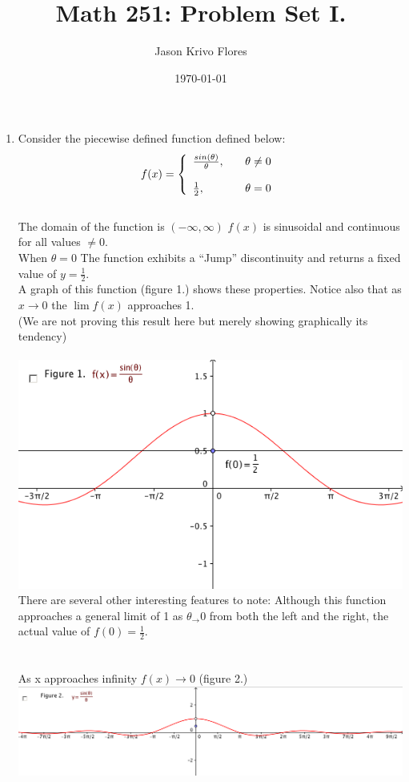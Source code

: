 \documentclass{article}
\title{Math 251: Problem Set I.}
\author{Jason Krivo Flores}
\date{\today}
\begin{document}
\maketitle{}
%
\begin{enumerate}
 \item Consider the piecewise defined function defined below:\\
\[
  f(x) = \left\{ 
  \begin{array}{l l}
    \frac{ sin(\theta)}{\theta}, \quad &  \theta \neq 0\\
    \\
      \frac{1}{2},  \quad &  \theta= 0\\
  \end{array} \right. \\
\]
\\
The domain of the function is $(-\infty, \infty)$
$f(x)$ is sinusoidal and continuous for all values $\neq 0$.\\ When $\theta = 0$ The function exhibits a ``Jump'' discontinuity and returns a fixed value of $y = \frac{1}{2}$.\\
A graph of this function (figure 1.) shows these properties. Notice also that as $x \to 0$ the $ \lim f(x) $ approaches 1.\\
(We are not proving this result here but merely showing graphically its tendency)\\
\\ \includegraphics[scale=0.5]{singraph}\\
There are several other interesting features to note: Although this function approaches a general limit of 1 as $\theta_\to 0$ from both the left and the right, the actual value of $f(0) = \frac{1}{2}$.\\
\\
\\As x approaches infinity $f (x) \to 0$ (figure 2.)\\
%
{\includegraphics[scale=0.5]{longview}}\\


\end{enumerate}
\end{document}
